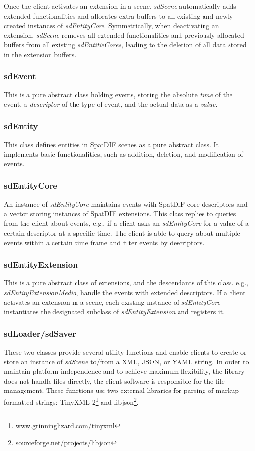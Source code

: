 \documentclass{article}
\begin{document}
Once the client activates an extension in a scene, \emph{sdScene} automatically adds extended functionalities and allocates extra buffers to all existing and newly created instances of \emph{sdEntityCore}. 
Symmetrically, when deactivating an extension, \emph{sdScene} removes all extended functionalities and previously allocated buffers from all existing \emph{sdEntitieCores}, leading to the deletion of all data stored in the extension buffers.

\subsubsection*{sdEvent}
This is a pure abstract class holding events, storing the absolute \emph{time} of the event, a \emph{descriptor} of the type of event, and the actual data as a \emph{value}.

\subsubsection*{sdEntity}
This class defines entities in SpatDIF scenes as a pure abstract class. It implements basic functionalities, such as addition, deletion, and modification of events.

\subsubsection*{sdEntityCore}
An instance of \emph{sdEntityCore} maintains events with SpatDIF core descriptors and a vector storing instances of SpatDIF extensions. 
This class replies to queries from the client about events, e.g., if a client asks an \emph{sdEntityCore} for a value of a certain descriptor at a specific time. 
The client is able to query about multiple events within a certain time frame and filter events by descriptors. 

\subsubsection*{sdEntityExtension}
This is a pure abstract class of extensions, and the descendants of this class. e.g., \emph{sdEntityExtensionMedia}, handle the events with extended descriptors. 
If a client activates an extension in a scene, each existing instance of \emph{sdEntityCore} instantiates the designated subclass of \emph{sdEntityExtension} and registers it.

\subsubsection*{sdLoader/sdSaver}
These two classes provide several utility functions and enable clients to create or store an instance of \emph{sdScene} to/from a XML, JSON, or YAML string. 
In order to maintain platform independence and to achieve maximum flexibility, the library does not handle files directly, the client software is responsible for the file management. 
These functions use two external libraries for parsing of markup formatted strings: TinyXML-2\footnote{\href{http://www.grinninglizard.com/tinyxml}{www.grinninglizard.com/tinyxml} } and libjson\footnote{\href{http://sourceforge.net/projects/libjson}{sourceforge.net/projects/libjson} }.
\end{document}
